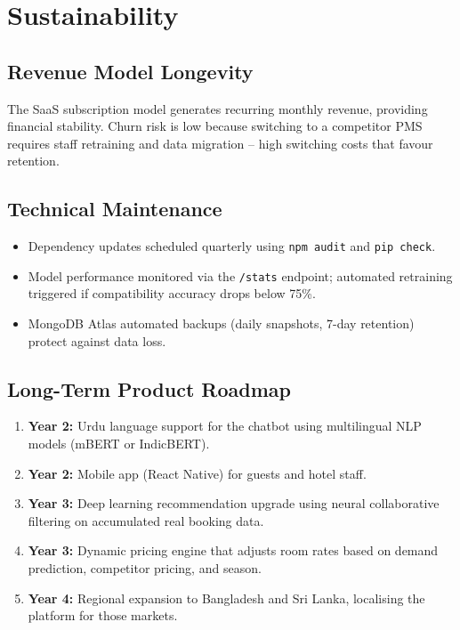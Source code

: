 \documentclass[12pt,a4paper]{report}
\begin{document}
\section{Sustainability}

\subsection*{Revenue Model Longevity}
The SaaS subscription model generates recurring monthly revenue, providing financial stability. Churn risk is low because switching to a competitor PMS requires staff retraining and data migration -- high switching costs that favour retention.

\subsection*{Technical Maintenance}
\begin{itemize}[leftmargin=*, label=\textbullet]
  \item Dependency updates scheduled quarterly using \texttt{npm audit} and \texttt{pip check}.
  \item Model performance monitored via the \texttt{/stats} endpoint; automated retraining triggered if compatibility accuracy drops below 75\%.
  \item MongoDB Atlas automated backups (daily snapshots, 7-day retention) protect against data loss.
\end{itemize}

\subsection*{Long-Term Product Roadmap}
\begin{enumerate}[leftmargin=*, label=\arabic*.]
  \item \textbf{Year 2:} Urdu language support for the chatbot using multilingual NLP models (mBERT or IndicBERT).
  \item \textbf{Year 2:} Mobile app (React Native) for guests and hotel staff.
  \item \textbf{Year 3:} Deep learning recommendation upgrade using neural collaborative filtering on accumulated real booking data.
  \item \textbf{Year 3:} Dynamic pricing engine that adjusts room rates based on demand prediction, competitor pricing, and season.
  \item \textbf{Year 4:} Regional expansion to Bangladesh and Sri Lanka, localising the platform for those markets.
\end{enumerate}
\end{document}
